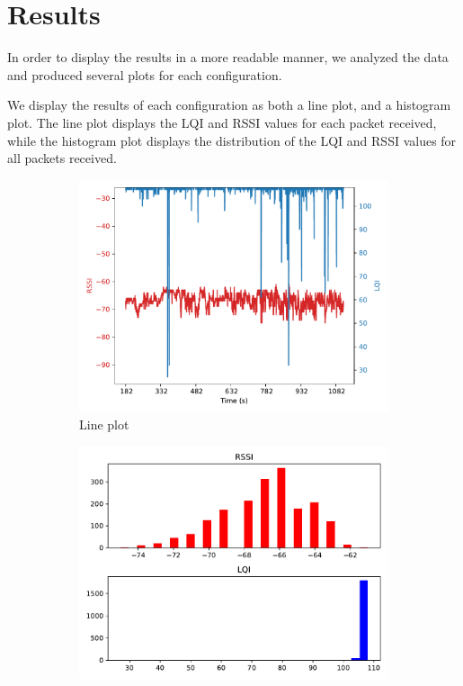 \documentclass[runningheads]{llncs}
\begin{document}
\clearpage

\section{Results}

In order to display the results in a more readable manner, we analyzed the data and produced several plots for each configuration.

We display the results of each configuration as both a line plot, and a histogram plot. The line plot displays the LQI and RSSI values for each packet received, while the histogram plot displays the distribution of the LQI and RSSI values for all packets received.

\vspace{0.3cm}

\begin{figure}[ht]
    \centering
    \begin{subfigure}[b]{0.45\textwidth}
        \centering
        \includegraphics[width=\textwidth]{images/1-50-0-26-line.pdf}
        \caption{Line plot}
    \end{subfigure}
    \hfill
    \begin{subfigure}[b]{0.45\textwidth}
        \centering
        \includegraphics[width=\textwidth]{images/1-50-0-26-histogram.pdf}

\end{subfigure}
\end{figure}
\end{document}
